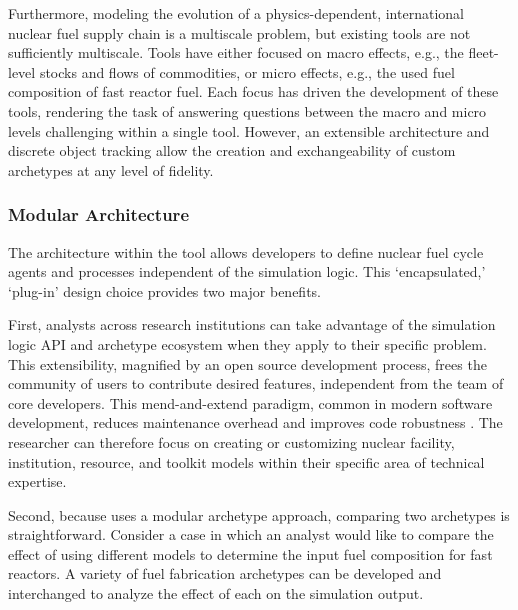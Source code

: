 Furthermore, modeling the evolution of a physics-dependent, international nuclear fuel supply
chain is a multiscale problem, but existing tools are not sufficiently 
multiscale. Tools have either focused on macro effects, e.g., the fleet-level
stocks and flows of commodities, or micro effects, e.g., the used fuel
composition of fast reactor fuel. Each focus has driven the
development of these tools, rendering the task of answering questions between
the macro and micro levels challenging within a single tool. 
However, an extensible architecture and discrete object tracking allow 
the creation and exchangeability of custom \Cyclus archetypes at any level of fidelity.

\subsubsection{Modular Architecture}

The architecture within the \Cyclus tool allows developers 
to define nuclear fuel cycle agents and processes independent of the simulation 
logic. This `encapsulated,' `plug-in'
design choice provides two major benefits. 

First, analysts across research institutions can take advantage of the 
simulation logic \gls{API} and archetype ecosystem when they apply \Cyclus to 
their specific problem. This extensibility, magnified by an open source 
development process, frees the community of users to contribute desired 
features, independent from the team of \Cyclus core developers. This 
mend-and-extend paradigm, common in modern software development, reduces 
maintenance overhead and improves code robustness \cite{citation_needed}. 
The researcher can therefore focus on creating or customizing nuclear 
facility, institution, resource, and toolkit models within their specific area 
of technical expertise. 

Second, because \Cyclus uses a modular archetype approach, comparing two 
archetypes is straightforward. Consider a case in which an analyst would like 
to compare the effect of using different models to determine the input fuel 
composition for fast reactors. A variety of fuel fabrication archetypes can be 
developed and interchanged to analyze the effect of each on the 
simulation output.


